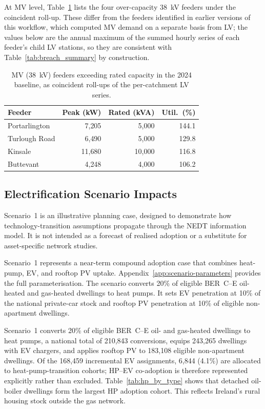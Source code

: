 \documentclass[preprint,12pt]{elsarticle}
\begin{document}
At MV level, Table~\ref{tab:mv_baseline_breach} lists the four
over-capacity 38~kV feeders under the coincident roll-up.
These differ from the feeders identified in earlier versions of this
workflow, which computed MV demand on a separate basis from LV; the values
below are the annual maximum of the summed hourly series of each feeder's
child LV stations, so they are consistent with
Table~\ref{tab:breach_summary} by construction.

\begin{table}[H]
\centering
\caption{MV (38~kV) feeders exceeding rated capacity in the 2024 baseline,
  as coincident roll-ups of the per-catchment LV series.}
\label{tab:mv_baseline_breach}
\small
\begin{tabular}{lrrr}
\toprule
\textbf{Feeder} & \textbf{Peak (kW)} & \textbf{Rated (kVA)} &
  \textbf{Util.\ (\%)} \\
\midrule
Portarlington  & \phantom{0}7{,}205 & \phantom{0}5{,}000 & 144.1 \\
Turlough Road  & \phantom{0}6{,}490 & \phantom{0}5{,}000 & 129.8 \\
Kinsale        &           11{,}680 &           10{,}000 & 116.8 \\
Buttevant      & \phantom{0}4{,}248 & \phantom{0}4{,}000 & 106.2 \\
\bottomrule
\end{tabular}
\end{table}

\subsection{Electrification Scenario Impacts}
\label{sec:results:scenario}

Scenario~1 is an illustrative planning case, designed to demonstrate how
technology-transition assumptions propagate through the NEDT information
model. It is not intended as a forecast of realised adoption or a substitute
for asset-specific network studies.

Scenario~1 represents a near-term compound adoption case that combines
heat-pump, EV, and rooftop PV uptake.
Appendix~\ref{app:scenario-parameters} provides the full parameterisation.
The scenario converts 20\% of eligible BER~C--E oil-heated and gas-heated
dwellings to heat pumps.
It sets EV penetration at 10\% of the national private-car stock and rooftop PV penetration at
10\% of eligible non-apartment dwellings.

Scenario~1 converts 20\% of eligible BER~C--E oil- and gas-heated dwellings
to heat pumps, a national total of 210,843 conversions, equips 243,265
dwellings with EV chargers, and applies rooftop PV to 183,108 eligible
non-apartment dwellings.
Of the 168,459 incremental EV assignments, 6,844 (4.1\%) are allocated to
heat-pump-transition cohorts; HP--EV co-adoption is therefore represented
explicitly rather than excluded.
Table~\ref{tab:hp_by_type} shows that detached oil-boiler dwellings form
the largest HP adoption cohort.
This reflects Ireland's rural housing stock outside the gas network.
\end{document}
